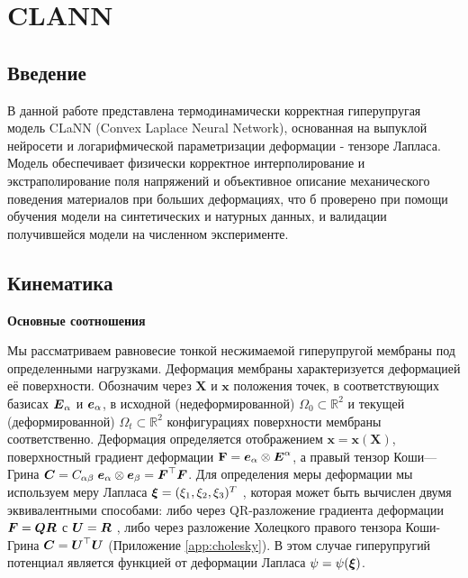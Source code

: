 \chapter{CLANN}

\section{Введение}
В данной работе представлена термодинамически корректная гиперупругая модель CLaNN 
(Convex Laplace Neural Network),
основанная на выпуклой нейросети и логарифмической параметризации деформации - тензоре Лапласа. 
Модель обеспечивает физически корректное интерполирование и экстраполирование поля напряжений и объективное описание механического поведения материалов при больших деформациях,
что б проверено при помощи обучения модели на синтетических и натурных данных, и валидации получившейся модели на численном эксперименте.

\section{Кинематика}
\textbf{Основные соотношения}

Мы рассматриваем равновесие тонкой несжимаемой гиперупругой мембраны под определенными нагрузками.
Деформация мембраны характеризуется деформацией её поверхности. 
Обозначим через \(\mathbf{X}\) и \(\mathbf{x}\) положения точек, 
в соответствующих базисах \(\boldsymbol{E}_{\alpha}\) и \(\boldsymbol{e}_{\alpha}\), 
в исходной (недеформированной) \(\Omega_0 \subset \mathbb{R}^2\) и текущей (деформированной) \(\Omega_t \subset \mathbb{R}^2\)
конфигурациях поверхности мембраны соответственно. 
Деформация определяется отображением \(\mathbf{x} = \mathbf{x}(\mathbf{X})\), 
поверхностный градиент деформации \(\mathbf{F} = \boldsymbol{e}_{\alpha} \otimes \boldsymbol{E}^{\alpha}\),
а правый тензор Коши—Грина \(\boldsymbol{C} = C_{\alpha\beta} \;\boldsymbol{e}_{\alpha} \otimes \boldsymbol{e}_{\beta} = \boldsymbol{F}^{\top} \boldsymbol{F}\). 
Для определения меры деформации мы используем меру Лапласа \(\boldsymbol{\xi} = (\xi_1 , \xi_2 , \xi_3)^T\) \cite{xi2023},
которая может быть вычислен двумя эквивалентными способами: 
либо через QR-разложение градиента деформации \(\boldsymbol{F} = \boldsymbol{Q} \boldsymbol{R}\) с \(\boldsymbol{U} = \boldsymbol{R}\) , 
либо через разложение Холецкого правого тензора Коши-Грина \(\boldsymbol{C} = \boldsymbol{U}^{\top}\boldsymbol{U}\) (Приложение \ref{app:cholesky}).
В этом случае гиперупругий потенциал является функцией от деформации Лапласа \(\psi = \psi(\boldsymbol{\xi})\).


